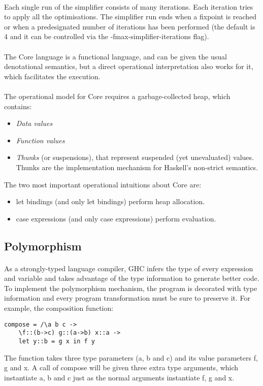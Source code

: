 \documentclass{article}
\begin{document}
	\paragraph{}
	Each single run of the simplifier consists of many iterations. Each iteration tries to apply all the optimisations. The simplifier run ends when a fixpoint is reached or when a predesignated number of iterations has been performed (the default is 4 and it can be controlled via the -fmax-simplifier-iterations flag).
	\paragraph{}
	The Core language is a functional language, and can be given the usual denotational semantics, but a direct operational interpretation also works for it, which facilitates the execution.
	\paragraph{}
	The operational model for Core requires a garbage-collected heap, which contains:
	\begin{itemize}
		\item \emph{Data values}
		\item \emph{Function values}
		\item \emph{Thunks} (or suspensions), that represent suspended (yet unevaluated) values. Thunks are the implementation mechanism for Haskell's non-strict semantics.
	\end{itemize}
	The two most important operational intuitions about Core are:
	\begin{itemize}
		\item let bindings (and only let bindings) perform heap allocation.
		\item case expressions (and only case expressions) perform evaluation.
	\end{itemize}
	\subsection{Polymorphism}
	\paragraph{}
	As a strongly-typed language compiler, GHC infers the type of every expression and variable and takes advantage of the type information to generate better code. To implement the polymorphism mechanism, the program is decorated with type information and every program transformation must be sure to preserve it. For example, the composition function:
	\begin{lstlisting}
compose = /\a b c ->
	\f::(b->c) g::(a->b) x::a ->
	let y::b = g x in f y
	\end{lstlisting}
	The function takes three type parameters (a, b and c) and its value parameters f, g and x. A call of compose will be given three extra type arguments, which instantiate a, b and c just as the normal arguments instantiate f, g and x.
\end{document}
